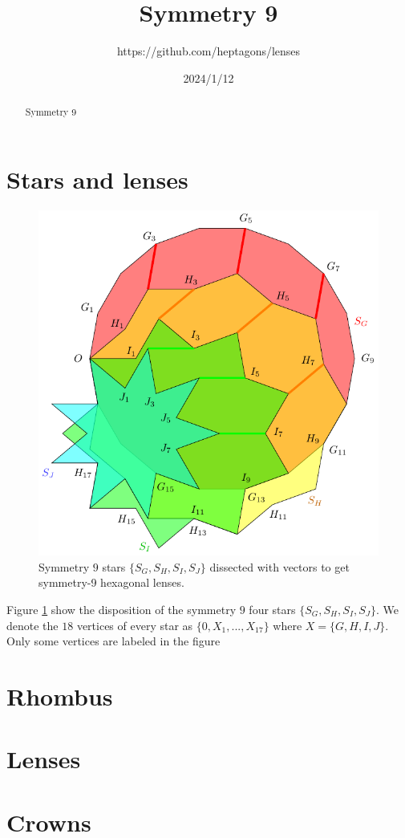 \documentclass[11pt]{article}
\title{Symmetry 9}
\author{https://github.com/heptagons/lenses}
\date{2024/1/12}
\begin{document}
\maketitle
\begin{abstract}
Symmetry 9
\end{abstract}

\section{Stars and lenses}

\begin{figure}[h]
\centering
\includegraphics[scale=1]{stars-9}
\caption{Symmetry $9$ stars $\{S_G,S_H,S_I,S_J\}$ dissected with vectors to get symmetry-9 hexagonal lenses.}
\label{fig:stars-9}
\end{figure}

Figure \ref{fig:stars-9} show the disposition of the symmetry $9$ four stars $\{S_G,S_H,S_I,S_J\}$. We denote the $18$ vertices of every star as $\{0,X_1,...,X_{17}\}$ where $X = \{G,H,I,J\}$. Only some vertices are labeled in the figure

\section{Rhombus}

\section{Lenses}

\section{Crowns}
\end{document}
